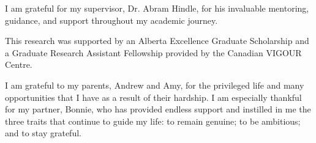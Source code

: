 \documentclass[\main/thesis.tex]{subfiles}
\begin{document}
\begin{acknowledgements} 

I am grateful for my supervisor, Dr. Abram Hindle, for his invaluable mentoring, guidance, and support throughout my academic journey.

This research was supported by an Alberta Excellence Graduate Scholarship and a Graduate Research Assistant Fellowship provided by the Canadian VIGOUR Centre.

I am grateful to my parents, Andrew and Amy, for the privileged life and many opportunities that I have as a result of their hardship.
I am especially thankful for my partner, Bonnie, who has provided endless support and instilled in
me the three traits that continue to guide my life: to remain genuine; to be ambitious; and to stay grateful.

\end{acknowledgements}
\end{document}
